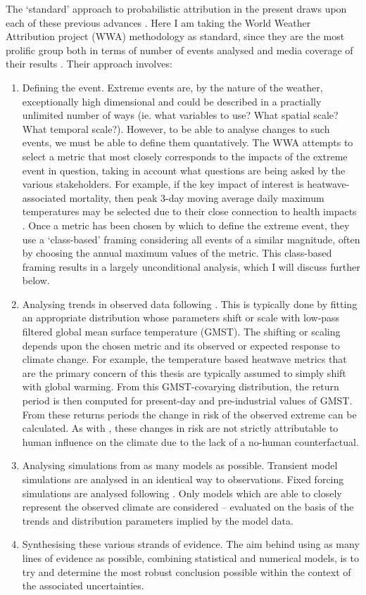     The `standard' approach to probabilistic attribution in the present draws upon each of these previous advances \citep{philip_protocol_2020}. Here I am taking the World Weather Attribution project (WWA) methodology as standard, since they are the most prolific group both in terms of number of events analysed and media coverage of their results \citep{van_oldenborgh_pathways_2021}. Their approach involves:
    \begin{enumerate}
      \item Defining the event. Extreme events are, by the nature of the weather, exceptionally high dimensional and could be described in a practially unlimited number of ways (ie. what variables to use? What spatial scale? What temporal scale?). However, to be able to analyse changes to such events, we must be able to define them quantatively. The WWA attempts to select a metric that most closely corresponds to the impacts of the extreme event in question, taking in account what questions are being asked by the various stakeholders. For example, if the key impact of interest is heatwave-associated mortality, then peak 3-day moving average daily maximum temperatures may be selected due to their close connection to health impacts \citep{dippoliti_impact_2010}. Once a metric has been chosen by which to define the extreme event, they use a `class-based' framing considering all events of a similar magnitude, often by choosing the annual maximum values of the metric. This class-based framing results in a largely unconditional analysis, which I will discuss further below.
      \item Analysing trends in observed data following \citet{van_oldenborgh_how_2007}. This is typically done by fitting an appropriate distribution whose parameters shift or scale with low-pass filtered global mean surface temperature (GMST). The shifting or scaling depends upon the chosen metric and its observed or expected response to climate change. For example, the temperature based heatwave metrics that are the primary concern of this thesis are typically assumed to simply shift with global warming. From this GMST-covarying distribution, the return period is then computed for present-day and pre-industrial values of GMST. From these returns periods the change in risk of the observed extreme can be calculated. As with \citet{van_oldenborgh_how_2007}, these changes in risk are not strictly attributable to human influence on the climate due to the lack of a no-human counterfactual.
      \item Analysing simulations from as many models as possible. Transient model simulations are analysed in an identical way to observations. Fixed forcing simulations are analysed following \citet{pall_anthropogenic_2011}. Only models which are able to closely represent the observed climate are considered -- evaluated on the basis of the trends and distribution parameters implied by the model data.
      \item Synthesising these various strands of evidence. The aim behind using as many lines of evidence as possible, combining statistical and numerical models, is to try and determine the most robust conclusion possible within the context of the associated uncertainties. 
    \end{enumerate}
